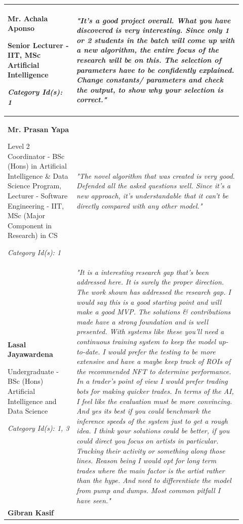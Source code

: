 \begin{longtable}{|p{0.27\linewidth}|p{0.655\linewidth}|}
\hline
\textbf{Mr. Achala Aponso}

Senior Lecturer - IIT, MSc Artificial Intelligence 

\textit{Category Id(s): 1}
 & 
 \textit{"It's a good project overall. What you have discovered is very interesting.
Since only 1 or 2 students in the batch will come up with a new algorithm, the entire focus of the research will be on this.
The selection of parameters have to be confidently explained. Change constants/ parameters and check the output, to show why your selection is correct."}
 \\
\hline
\textbf{Mr. Prasan Yapa}

Level 2 Coordinator - BSc (Hons) in Artificial Intelligence \& Data Science Program, Lecturer - Software Engineering - IIT, MSc (Major Component in Research) in CS

\textit{Category Id(s): 1}
 & 
 \textit{"The novel algorithm that was created is very good. Defended all the asked questions well. Since it's a new approach, it's understandable that it can't be directly compared with any other model."}
 \\
\hline
\textbf{Lasal Jayawardena}

Undergraduate - BSc (Hons) Artificial Intelligence and Data Science

\textit{Category Id(s): 1, 3}
 & 
 \textit{"It is a interesting research gap that's been addressed here. It is surely the proper direction. The work shown has addressed the research gap. I would say this is a good starting point and will make a good MVP. The solutions \& contributions made have a strong foundation and is well presented. With systems like these you'll need a continuous training system to keep the model up-to-date. I would prefer the testing to be more extensive and have a maybe keep track of ROIs of the recommended NFT to determine performance.
 In a trader's point of view I would prefer trading bots for making quicker trades. In terms of the AI, I feel like the evaluation must be more convincing. And yes its best if you could benchmark the inference speeds of the system just to get a rough idea. 
I think your solutions could be better, if you could direct you focus on artists in particular. Tracking their activity or something along those lines. Reason being I would opt for long term trades where the main factor is the artist rather than the hype. And need to differentiate the model from pump and dumps. Most common pitfall I have seen."}
 \\
\hline
\textbf{Gibran Kasif}


\end{longtable}
